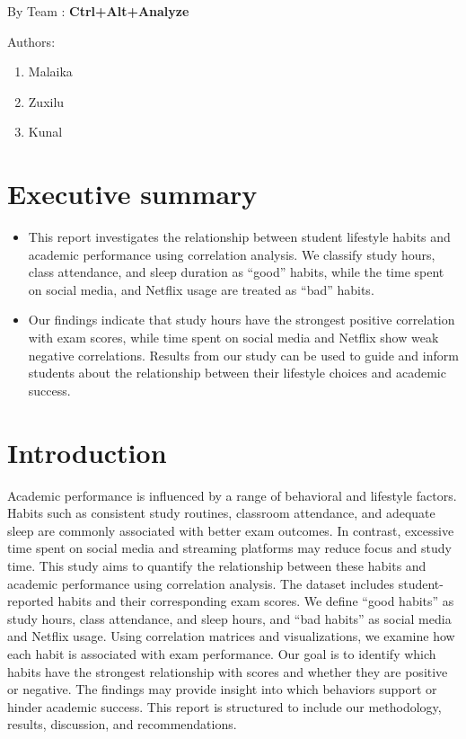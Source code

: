\documentclass[
  11pt,
  letterpaper,
  DIV=11,
  numbers=noendperiod]{scrartcl}
\providecommand{\tightlist}{%
  \setlength{\itemsep}{0pt}\setlength{\parskip}{0pt}}\usepackage{longtable,booktabs,array}
\begin{document}
By Team : \textbf{Ctrl+Alt+Analyze}

Authors:

\begin{enumerate}
\def\labelenumi{\arabic{enumi}.}
\item
  Malaika
\item
  Zuxilu
\item
  Kunal
\end{enumerate}

\section{Executive summary}\label{executive-summary}

\begin{itemize}
\tightlist
\item
  This report investigates the relationship between student lifestyle
  habits and academic performance using correlation analysis. We
  classify study hours, class attendance, and sleep duration as ``good''
  habits, while the time spent on social media, and Netflix usage are
  treated as ``bad'' habits.
\item
  Our findings indicate that study hours have the strongest positive
  correlation with exam scores, while time spent on social media and
  Netflix show weak negative correlations. Results from our study can be
  used to guide and inform students about the relationship between their
  lifestyle choices and academic success.
\end{itemize}

\section{Introduction}\label{introduction}

Academic performance is influenced by a range of behavioral and
lifestyle factors. Habits such as consistent study routines, classroom
attendance, and adequate sleep are commonly associated with better exam
outcomes. In contrast, excessive time spent on social media and
streaming platforms may reduce focus and study time. This study aims to
quantify the relationship between these habits and academic performance
using correlation analysis. The dataset includes student-reported habits
and their corresponding exam scores. We define ``good habits'' as study
hours, class attendance, and sleep hours, and ``bad habits'' as social
media and Netflix usage. Using correlation matrices and visualizations,
we examine how each habit is associated with exam performance. Our goal
is to identify which habits have the strongest relationship with scores
and whether they are positive or negative. The findings may provide
insight into which behaviors support or hinder academic success. This
report is structured to include our methodology, results, discussion,
and recommendations.
\end{document}
